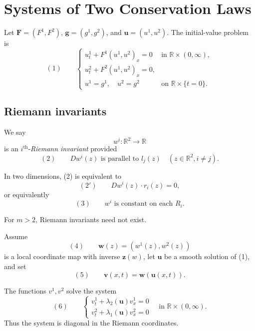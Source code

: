 \section{Systems of Two Conservation Laws}\label{sec:systems-two-conservation-laws}

Let $\mathbf F=(F^1,F^2)$, $\mathbf g=(g^1,g^2)$, and $\mathbf u=(u^1,u^2)$. The initial-value problem is
\[
(1)\qquad
\begin{cases}
u^1_t+F^1(u^1,u^2)_x=0 & \text{in }\mathbb R\times(0,\infty),\\
u^2_t+F^2(u^1,u^2)_x=0,\\
u^1=g^1,\quad u^2=g^2 & \text{on }\mathbb R\times\{t=0\}.
\end{cases}
\]

\subsection{Riemann invariants}\label{sec:riemann-invariants}

\begin{definition}
\label{def:riemann-invariant}

We say
$$w^i:\mathbb{R}^2\to\mathbb{R}$$
is an $i^{\text{th}}$-\textit{Riemann invariant} provided
$$(2) \qquad Dw^i(z) \text{ is parallel to } l_j(z) \quad (z\in\mathbb{R}^2, i\neq j).$$
\end{definition}

In two dimensions, (2) is equivalent to
\[
(2')\qquad Dw^i(z)\cdot r_i(z)=0,
\]
or equivalently
\[
(3)\qquad w^i\text{ is constant on each }R_i.
\]

\begin{remark}
\label{rem:riemann-invariants-mgt2-remark}

For $m>2$, Riemann invariants need not exist.
\end{remark}

Assume
\[
(4)\qquad \mathbf w(z)=(w^1(z),w^2(z))
\]
is a local coordinate map with inverse $\mathbf z(w)$, let $\mathbf u$ be a smooth solution of (1), and set
\[
(5)\qquad \mathbf v(x,t)=\mathbf w(\mathbf u(x,t)).
\]

\begin{theorem}
\label{thm:conservation-laws-riemann-invariants}

The functions $v^1, v^2$ solve the system
$$(6) \qquad \begin{cases} v^1_t + \lambda_2(\mathbf{u})v^1_x = 0 \\ v^2_t + \lambda_1(\mathbf{u})v^2_x = 0 \end{cases} \quad \text{in } \mathbb{R}\times(0,\infty).$$
Thus the system is diagonal in the Riemann coordinates.
\end{theorem}

